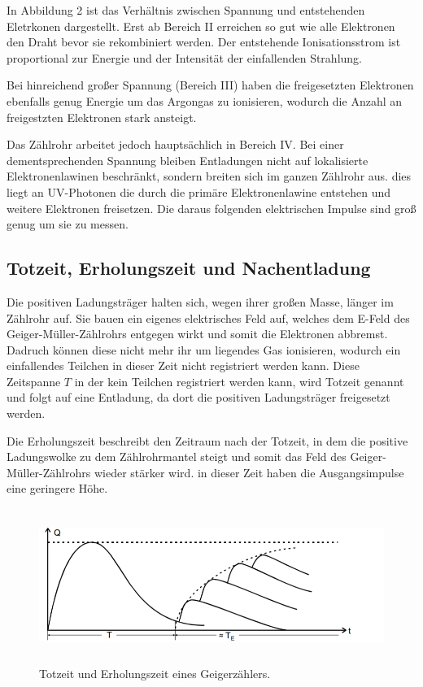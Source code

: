  In Abbildung 2 ist das Verhältnis zwischen Spannung und entstehenden Eletrkonen dargestellt. Erst ab Bereich II
erreichen so gut wie alle Elektronen den Draht bevor sie rekombiniert werden. Der entstehende Ionisationsstrom ist
proportional zur Energie und der Intensität der einfallenden Strahlung.

Bei hinreichend großer Spannung (Bereich III) haben die freigesetzten Elektronen ebenfalls genug Energie um das Argongas zu ionisieren,
wodurch die Anzahl an freigestzten Elektronen stark ansteigt.

Das Zählrohr arbeitet jedoch hauptsächlich in Bereich IV. Bei einer dementsprechenden Spannung bleiben Entladungen nicht
auf lokalisierte Elektronenlawinen beschränkt, sondern breiten sich im ganzen Zählrohr aus. dies liegt
an UV-Photonen die durch die primäre Elektronenlawine entstehen und weitere Elektronen freisetzen. Die
daraus folgenden elektrischen Impulse sind groß genug um sie zu messen.

\subsection{Totzeit, Erholungszeit und Nachentladung}

Die positiven Ladungsträger halten sich, wegen ihrer großen Masse, länger im Zählrohr auf. Sie bauen ein eigenes
elektrisches Feld auf, welches dem E-Feld des Geiger-Müller-Zählrohrs entgegen wirkt und somit die Elektronen abbremst.
Dadruch können diese nicht mehr ihr um liegendes Gas ionisieren, wodurch ein einfallendes Teilchen in dieser Zeit
nicht registriert werden kann. Diese Zeitspanne $T$ in der kein Teilchen registriert werden kann, wird Totzeit genannt
und folgt auf eine Entladung, da dort die positiven Ladungsträger freigesetzt werden.

Die Erholungszeit beschreibt den Zeitraum nach der Totzeit, in dem die positive Ladungswolke zu dem Zählrohrmantel steigt und somit
das Feld des Geiger-Müller-Zählrohrs wieder stärker wird. in dieser Zeit haben die Ausgangsimpulse eine geringere Höhe.


\begin{figure}[H]
  \centering
  \includegraphics[height=5cm]{totzeit.PNG}
  \caption{Totzeit und Erholungszeit eines Geigerzählers. \cite{sample}}
  \label{fig:totzeit}
\end{figure}

